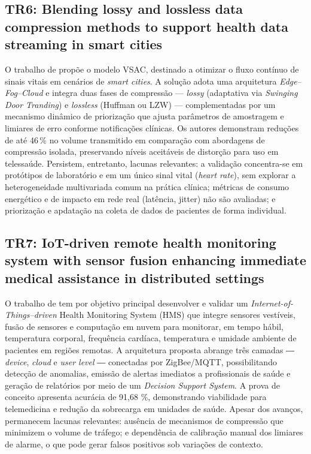 \documentclass[twoside,english,brazilian]{UNISINOSmonografia}
\begin{document}
\subsection{TR6: Blending lossy and lossless data compression methods to support health data streaming in smart cities \cite{Andrade2025}}
O trabalho de \cite{Andrade2025} propõe o modelo VSAC, destinado a otimizar o fluxo contínuo de sinais vitais em cenários de \textit{smart cities}. A solução adota uma arquitetura \textit{Edge–Fog–Cloud} e integra duas fases de compressão — \textit{lossy} (adaptativa via \textit{Swinging Door Tranding}) e \textit{lossless} (Huffman ou LZW) — complementadas por um mecanismo dinâmico de priorização que ajusta parâmetros de amostragem e limiares de erro conforme notificações clínicas. Os autores demonstram reduções de até 46\,\% no volume transmitido em comparação com abordagens de compressão isolada, preservando níveis aceitáveis de distorção para uso em telessaúde. Persistem, entretanto, lacunas relevantes: a validação concentra-se em protótipos de laboratório e em um único sinal vital (\textit{heart rate}), sem explorar a heterogeneidade multivariada comum na prática clínica; métricas de consumo energético e de impacto em rede real (latência, jitter) não são avaliadas; e priorização e apdatação na coleta de dados de pacientes de forma individual.

\subsection{TR7: IoT-driven remote health monitoring system with sensor fusion enhancing immediate medical assistance in distributed settings \cite{MOHAPATRA2025}}
O trabalho de \cite{MOHAPATRA2025} tem por objetivo principal desenvolver e validar um \textit{Internet-of-Things–driven} Health Monitoring System (HMS) que integre sensores vestíveis, fusão de sensores e computação em nuvem para monitorar, em tempo hábil, temperatura corporal, frequência cardíaca, temperatura e umidade ambiente de pacientes em regiões remotas. A arquitetura proposta abrange três camadas ― \textit{device}, \textit{cloud} e \textit{user level} ― conectadas por ZigBee/MQTT, possibilitando detecção de anomalias, emissão de alertas imediatos a profissionais de saúde e geração de relatórios por meio de um \textit{Decision Support System}. A prova de conceito apresenta acurácia de 91,68 \%, demonstrando viabilidade para telemedicina e redução da sobrecarga em unidades de saúde. Apesar dos avanços, permanecem lacunas relevantes: ausência de mecanismos de compressão que minimizem o volume de tráfego; e dependência de calibração manual dos limiares de alarme, o que pode gerar falsos positivos sob variações de contexto.
\end{document}
